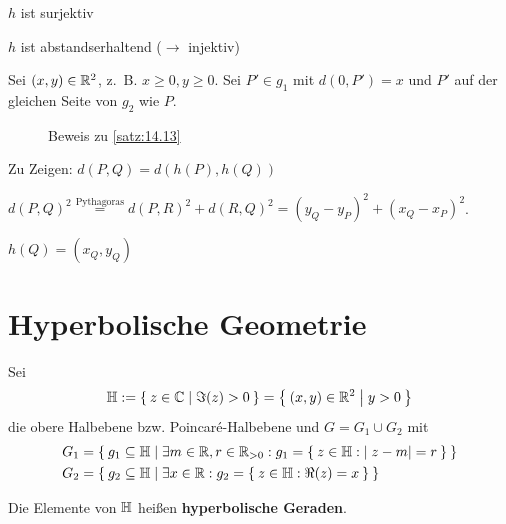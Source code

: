 \begin{beweis}
\begin{enumerate}[label=(\roman*)]
            \begin{behauptung}[1]
                $h$ ist surjektiv
            \end{behauptung}
            \begin{behauptung}[2]
                $h$ ist abstandserhaltend ($\rightarrow$ injektiv)
            \end{behauptung}
            \begin{beweis}[von 1]
                Sei $(x, y) \in \mathbb{R}^2$, z.~B. $x \geq 0, y \geq 0$.
                Sei $P' \in g_1$ mit $d(0, P') = x$ und
                $P'$ auf der gleichen Seite von $g_2$ wie $P$.
            \end{beweis}
            \begin{beweis}[von 2]
                \begin{figure}[ht]
                    \centering
                    \subfloat[Schritt 1]{
                        \resizebox{0.45\linewidth}{!}{}
                        \label{fig:14.13.3}
                    }%
                    \label{fig:14.13.0.2}
                    \caption{Beweis zu \cref{satz:14.13}}
                \end{figure}
                Zu Zeigen: $d(P, Q) = d(h(P), h(Q))$

                $d(P, Q)^2 \overset{\text{Pythagoras}}{=} d(P, R)^2 + d(R, Q)^2 = (y_Q - y_P)^2 + (x_Q - x_P)^2$.

                $h(Q) = (x_Q, y_Q)$
            \end{beweis}
    \end{enumerate}
\end{beweis}
\section{Hyperbolische Geometrie}
\begin{definition}%
    Sei
        \[\mathbb{H}:= \Set{z \in \ensuremath{\mathbb{C}}| \Im(z) > 0} = \Set{(x,y) \in \ensuremath{\mathbb{R}}^2 | y > 0}\]
    die obere Halbebene bzw. Poincaré-Halbebene und $G = G_1 \cup G_2$
    mit
        \begin{align*}
            G_1 &= \Set{g_1 \subseteq \ensuremath{\mathbb{H}}| \exists m \in \ensuremath{\mathbb{R}}, r \in \ensuremath{\mathbb{R}}_{>0}: g_1 = \Set{z \in \ensuremath{\mathbb{H}}: |z-m|=r}}\\
            G_2 &= \Set{g_2 \subseteq \ensuremath{\mathbb{H}}| \exists x \in \ensuremath{\mathbb{R}}: g_2 = \Set{z \in \ensuremath{\mathbb{H}}: \Re(z) = x}}
        \end{align*}

    Die Elemente von $\mathbb{H}$ heißen \textbf{hyperbolische Geraden}.
\end{definition}

